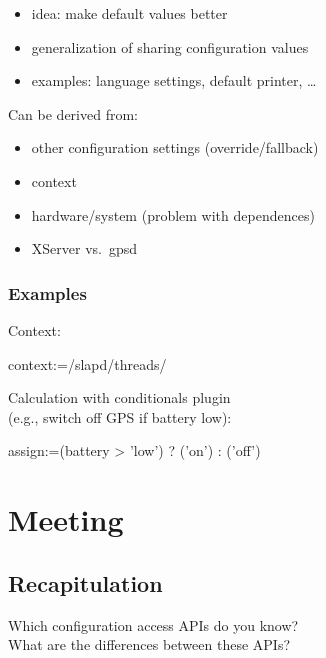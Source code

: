 \begin{frame}
	\begin{itemize}
	\item idea: make default values better
	\item generalization of sharing configuration values
	\item examples: language settings, default printer, \dots
	\end{itemize}
	\pause
	\vspace{1cm}
	Can be derived from:
	\begin{itemize}
	\item other configuration settings (override/fallback)
	\item context~\cite{raab2017introducing}
	\item hardware/system (problem with dependences)
	\pause
	\vspace{1cm}
	\item XServer vs.\ gpsd
	\end{itemize}
\end{frame}

\begin{frame}[fragile]
	\frametitle{Examples}
	Context:
	\begin{code}
	context:=/slapd/threads/%
	\end{code}

	\pause
	\vspace{1cm}
	Calculation with conditionals plugin
	\\ (e.g., switch off GPS if battery low):
	\begin{code}
	assign:=(battery > 'low') ? ('on') : ('off')
	\end{code}
\end{frame}

\section{Meeting}

\subsection{Recapitulation}


\begin{frame}
	\begin{task}
	Which configuration access APIs do you know? \\
	What are the differences between these APIs?
	\end{task}
\end{frame}

